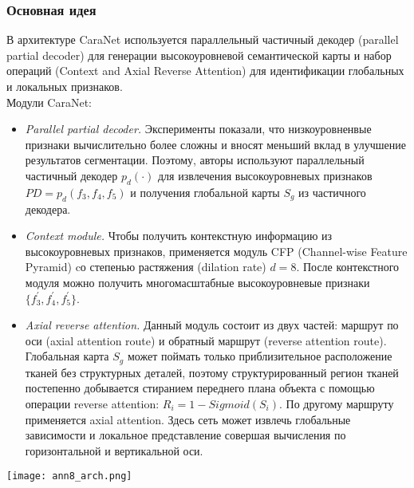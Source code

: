 \subsubsection*{Основная идея}
В архитектуре CaraNet используется параллельный частичный декодер 
(parallel partial decoder) для генерации высокоуровневой семантической
карты и набор операций (Context and Axial Reverse Attention) для 
идентификации глобальных и локальных признаков. 
\\Модули CaraNet:
\begin{itemize}
    \item \textit{Parallel partial decoder.} Эксперименты показали,
    что низкоуровненвые признаки вычислительно более сложны и вносят 
    меньший вклад в улучшение результатов сегментации. Поэтому, авторы 
    используют параллельный частичный декодер \(p_d(\cdot)\) для извлечения 
    высокоуровневых признаков \(PD=p_d(f_3,f_4,f_5)\) и получения глобальной карты 
    \(S_g\) из частичного декодера.
    \item \textit{Context module.} Чтобы получить контекстную информацию из высокоуровневых
    признаков, применяется модуль CFP (Channel-wise Feature Pyramid) cо степенью растяжения 
    (dilation rate) \(d=8\). После контекстного модуля можно получить многомасштабные 
    высокоуровневые признаки \(\{f_{3}^{'}, f_{4}^{'}, f_{5}^{'}\}\).
    \item \textit{Axial reverse attention.} Данный модуль состоит из двух частей:
    маршрут по оси (axial attention route) и обратный маршрут (reverse attention route). Глобальная 
    карта \(S_g\) может поймать только приблизительное расположение тканей без структурных деталей, 
    поэтому структурированный регион тканей постепенно добывается стиранием переднего плана 
    объекта с помощью операции reverse attention: \(R_{i}=1-Sigmoid(S_{i})\). По другому 
    маршруту применяется axial attention. Здесь сеть может извлечь глобальные зависимости и 
    локальное представление совершая вычисления по горизонтальной и вертикальной оси. 
\end{itemize}
\begin{minipage}{1.0\linewidth}
    \begin{center}
        \texttt{[image: ann8\_arch.png]} \\
    \end{center}
    
\end{minipage}
